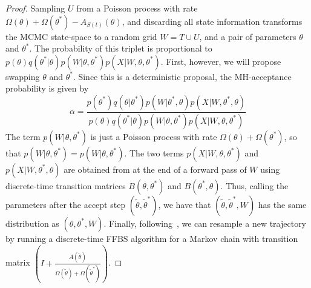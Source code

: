 \begin{proof}
  Sampling $U$ from a Poisson process with rate $\Omega(\theta) +
  \Omega(\theta^*) - A_{S(t)}(\theta)$, and discarding all state 
  information transforms the MCMC state-space to a random grid $W = T \cup U$,
  and a pair of parameters $\theta$ and $\theta^*$. The probability of this
  triplet is proportional to $p(\theta)q(\theta^*|\theta)p(W|\theta,\theta^*)
  p(X|W,\theta,\theta^*)$.
First, however, we will propose swapping $\theta$ and $\theta^*$. Since this
is a deterministic proposal, the MH-acceptance probability is given by
$$\alpha = \frac{p(\theta^*)q(\theta|\theta^*)p(W|\theta^*,\theta)
p(X|W,\theta^*,\theta)}{p(\theta)q(\theta^*|\theta)p(W|\theta,\theta^*)
p(X|W,\theta,\theta^*)}$$
The term $p(W|\theta,\theta^*)$ is just a Poisson process with rate $\Omega(\theta)+
\Omega(\theta^*)$, so that $p(W|\theta,\theta^*) = p(W|\theta,\theta^*)$. The
two terms $p(X|W,\theta,\theta^*)$ and $p(X|W,\theta^*,\theta)$ are obtained
from at the end of a forward pass of $W$ using discrete-time transition matrices
$B(\theta,\theta^*)$ and $B(\theta^*,\theta)$. Thus, calling the parameters 
after the accept step $(\tilde{\theta}, \tilde{\theta}^*)$, we have that
$(\tilde{\theta}, \tilde{\theta}^*,W)$ has the same distribution as
$(\theta, \theta^*,W)$.
  Finally, following~\cite{RaoTeh13},
  we can resample a new trajectory by running a discrete-time FFBS algorithm
  for a Markov chain with transition matrix $\left(I + \frac{A(\tilde{\theta})}
  {\Omega(\tilde{\theta}) + \Omega(\tilde{\theta}^*)}\right)$.

\end{proof}
